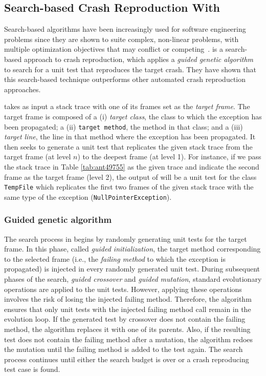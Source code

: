 \subsection{Search-based Crash Reproduction With \evocrash}

Search-based algorithms have been increasingly used for software engineering problems since they are shown to suite complex, non-linear problems, with multiple optimization objectives that may conflict or competing~\cite{harman12trends}.
\evocrash \cite{soltani2017, Soltani2018a} is a search-based approach to crash reproduction, which applies a \textit{guided genetic algorithm} to search for a unit test that reproduces the target crash. They have shown that this search-based technique outperforms other automated crash reproduction approaches.

\evocrash takes as input a stack trace with one of its frames set as the \emph{target frame}. 
The target frame is composed of a
(i) \emph{target class}, the class to which the exception has been propagated; a
(ii) \texttt{target method}, the method in that class; and a
(iii) \emph{target line}, the line in that method where the exception has been propagated. 
It then seeks to generate a unit test that replicates the given stack trace from the target frame (at level $n$) to the deepest frame (at level 1). 
For instance, if we pass the stack trace in Table \ref{tab:ant49755} as the given trace and indicate the second frame as the target frame (level 2), the output of \evocrash will be a unit test for the class \texttt{TempFile} which replicates the first two frames of the given stack trace with the same type of the exception (\texttt{NullPointerException}).

\subsubsection{Guided genetic algorithm}
\label{sec:background:evocrash:guidedalg}
The search process in \evocrash begins by randomly generating unit tests for the target frame.
In this phase, called \emph{guided initialization}, the target method corresponding to the selected frame (i.e., the \emph{failing method} to which the exception is propagated) is injected in every randomly generated unit test.
During subsequent phases of the search, \emph{guided crossover} and \emph{guided mutation}, standard evolutionary operations are applied to the unit tests.
However, applying these operations involves the risk of losing the injected failing method.
Therefore, the algorithm ensures that only unit tests with the injected failing method call remain in the evolution loop. 
If the generated test by crossover does not contain the failing method, the algorithm replaces it with one of its parents. 
Also, if the resulting test does not contain the failing method after a mutation, the algorithm redoes the mutation until the failing method is added to the test again.
The search process continues until either the search budget is over or a crash reproducing test case is found.


